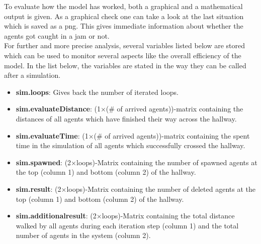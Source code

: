 
\noi To evaluate how the model has worked, both a graphical and a mathematical output is given. As a graphical check one can take a look at the last situation which is saved as a png. This gives immediate information about whether the agents got caught in a jam or not.\\
For further and more precise analysis, several variables listed below are stored which can be used to monitor several aspects like the overall efficiency of the model. In the list below, the variables are stated in the way they can be called after a simulation.
\begin{itemize}
	\item \textbf{sim.loops}: Gives back the number of iterated loops.
	\item \textbf{sim.evaluateDistance}: (1$\times$(\# of arrived agents))-matrix containing the distances of all agents which have finished their way across the hallway.
	\item \textbf{sim.evaluateTime}: (1$\times$(\# of arrived agents))-matrix containing the spent time in the simulation of all agents which successfully crossed the hallway.
	\item \textbf{sim.spawned}: (2$\times$loops)-Matrix containing the number of spawned agents at the top (column 1) and bottom (column 2) of the hallway.
	\item \textbf{sim.result}: (2$\times$loops)-Matrix containing the number of deleted agents at the top (column 1) and bottom (column 2) of the hallway.
	\item \textbf{sim.additionalresult}: (2$\times$loops)-Matrix containing the total distance walked by all agents during each iteration step (column 1) and the total number of agents in the system (column 2).
\end{itemize}


